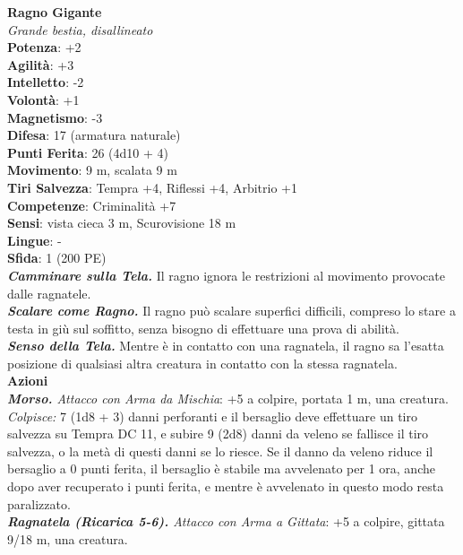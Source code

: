 \begin{multicols}{2}
\medskip\textbf{Ragno Gigante}\\
\emph{Grande bestia, disallineato}\\
\textbf{Potenza}: +2\\
\textbf{Agilità}: +3\\
\textbf{Intelletto}: -2\\
\textbf{Volontà}: +1\\
\textbf{Magnetismo}: -3\\
\textbf{Difesa}: 17 (armatura naturale)\\
\textbf{Punti Ferita}: 26 (4d10 + 4)\\
\textbf{Movimento}: 9 m, scalata 9 m\\
\textbf{Tiri Salvezza}:  Tempra +4, Riflessi +4, Arbitrio +1 \\
\textbf{Competenze}: Criminalità +7\\
\textbf{Sensi}: vista cieca 3 m, Scurovisione 18 m\\
\textbf{Lingue}: -\\
\textbf{Sfida}: 1 (200 PE)\smallskip\\
\emph{\textbf{Camminare sulla Tela.}} Il ragno ignora le restrizioni al movimento provocate dalle ragnatele.\\
\emph{\textbf{Scalare come Ragno.}} Il ragno può scalare superfici difficili, compreso lo stare a testa in giù sul soffitto, senza bisogno di effettuare una prova di abilità.\\
\emph{\textbf{Senso della Tela.}} Mentre è in contatto con una ragnatela, il ragno sa l'esatta posizione di qualsiasi altra creatura in contatto con la stessa ragnatela.\\
\smallskip\textbf{Azioni}\\
\emph{\textbf{Morso.} Attacco con Arma da Mischia}: +5 a colpire, portata 1 m, una creatura.\\
\emph{Colpisce:} 7 (1d8 + 3) danni perforanti e il bersaglio deve effettuare un tiro salvezza su Tempra DC 11, e subire 9 (2d8) danni da veleno se fallisce il tiro salvezza, o la metà di questi danni se lo riesce. Se il danno da veleno riduce il bersaglio a 0 punti ferita, il bersaglio è stabile ma avvelenato per 1 ora, anche dopo aver recuperato i punti ferita, e mentre è avvelenato in questo modo resta paralizzato.\\

\emph{\textbf{Ragnatela (Ricarica 5-6).} Attacco con Arma a Gittata}: +5 a colpire, gittata 9/18 m, una creatura.\\


\end{multicols}
